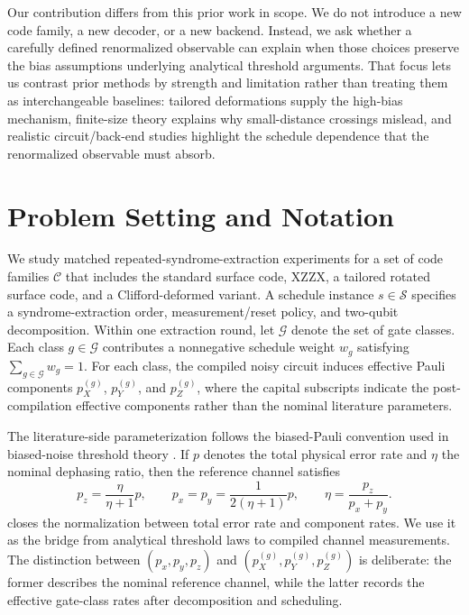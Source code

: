 \documentclass{article} %
\begin{document}
Our contribution differs from this prior work in scope. We do not introduce a new code family, a new decoder, or a new backend. Instead, we ask whether a carefully defined renormalized observable can explain when those choices preserve the bias assumptions underlying analytical threshold arguments. That focus lets us contrast prior methods by strength and limitation rather than treating them as interchangeable baselines: tailored deformations supply the high-bias mechanism, finite-size theory explains why small-distance crossings mislead, and realistic circuit/back-end studies highlight the schedule dependence that the renormalized observable must absorb.

\section{Problem Setting and Notation}
\label{sec:problem}

We study matched repeated-syndrome-extraction experiments for a set of code families $\mathcal{C}$ that includes the standard surface code, XZZX, a tailored rotated surface code, and a Clifford-deformed variant. A schedule instance $s \in \mathcal{S}$ specifies a syndrome-extraction order, measurement/reset policy, and two-qubit decomposition. Within one extraction round, let $\mathcal{G}$ denote the set of gate classes. Each class $g \in \mathcal{G}$ contributes a nonnegative schedule weight $w_g$ satisfying $\sum_{g \in \mathcal{G}} w_g = 1$. For each class, the compiled noisy circuit induces effective Pauli components $p_X^{(g)}$, $p_Y^{(g)}$, and $p_Z^{(g)}$, where the capital subscripts indicate the post-compilation effective components rather than the nominal literature parameters.

The literature-side parameterization follows the biased-Pauli convention used in biased-noise threshold theory \citep{xiao2024_finite_size_corrections,tuckett2020_fault_tolerant_thresholds,bonilla2021_xzzx}. If $p$ denotes the total physical error rate and $\eta$ the nominal dephasing ratio, then the reference channel satisfies
\begin{equation}
\label{eq:biased-components}
p_z = \frac{\eta}{\eta+1}p,
\qquad
p_x = p_y = \frac{1}{2(\eta+1)}p,
\qquad
\eta = \frac{p_z}{p_x+p_y}.
\end{equation}
 closes the normalization between total error rate and component rates. We use it as the bridge from analytical threshold laws to compiled channel measurements. The distinction between $(p_x,p_y,p_z)$ and $(p_X^{(g)},p_Y^{(g)},p_Z^{(g)})$ is deliberate: the former describes the nominal reference channel, while the latter records the effective gate-class rates after decomposition and scheduling.
\end{document}

